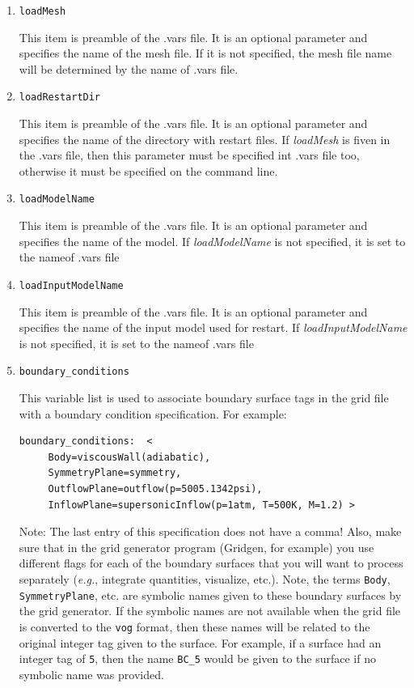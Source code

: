 \documentclass{article}
\begin{document}
\begin{enumerate}

\item {\tt loadMesh}

This item is preamble of the .vars file. It is an optional parameter and specifies the name of the 
mesh file. If it is not specified, the mesh file name will be determined by the name of .vars file.

\item {\tt loadRestartDir}

This item is preamble of the .vars file. It is an optional parameter and specifies the name of the
directory with restart files. If \emph{loadMesh} is fiven in the .vars file, 
then this parameter must be specified int .vars file too, otherwise it must be specified on the command line.

\item {\tt loadModelName}

This item is preamble of the .vars file. It is an optional parameter and specifies the name of the
model. If \emph{loadModelName} is not specified, it is set to the nameof .vars file

\item {\tt loadInputModelName}

This item is preamble of the .vars file. It is an optional parameter and specifies the name of the
input model used for restart. If \emph{loadInputModelName} is not specified, it is set to the nameof .vars file
 
\item {\tt boundary\_conditions}

This variable list is used to associate boundary surface tags in 
the grid file with a boundary condition specification.  For example:
\begin{verbatim}
boundary_conditions:  <
     Body=viscousWall(adiabatic),
     SymmetryPlane=symmetry,
     OutflowPlane=outflow(p=5005.1342psi),
     InflowPlane=supersonicInflow(p=1atm, T=500K, M=1.2) >
\end{verbatim}
Note: The last entry of this specification does not have a comma!
Also, make sure that in the grid generator program (Gridgen, for
example) you use different flags for each of the boundary surfaces
that you will want to process separately ({\it e.g.}, integrate
quantities, visualize, etc.).  Note, the terms {\tt Body}, {\tt
  SymmetryPlane}, etc.  are symbolic names given to these boundary
surfaces by the grid generator.  If the symbolic names are not
available when the grid file is converted to the {\tt vog} format,
then these names will be related to the original integer tag given to
the surface.  For example, if a surface had an integer tag of {\tt 5},
then the name {\tt BC\_5} would be given to the surface if no symbolic
name was provided.


\end{enumerate}
\end{document}
